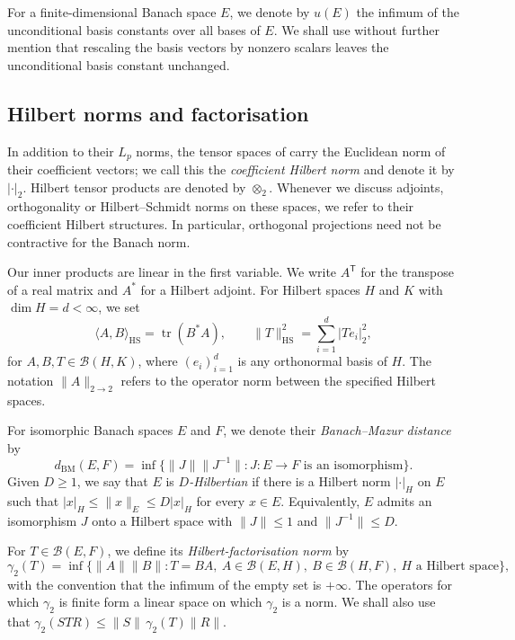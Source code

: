 \documentclass[11pt,a4paper,reqno]{amsart}
\theoremstyle{definition}
\newcommand{\norm}[1]{\lVert #1\rVert}
\DeclareMathOperator{\tr}{tr}
\numberwithin{equation}{section}
\begin{document}
For a finite-dimensional Banach space $E$, we denote by $u(E)$ the infimum of the unconditional basis constants over all bases of $E$. We shall use without further mention that rescaling the basis vectors by nonzero scalars leaves the unconditional basis constant unchanged.

\subsection{Hilbert norms and factorisation}\label{sec:hilbert-norms}
In addition to their $L_p$ norms, the tensor spaces of  carry the Euclidean norm of their coefficient vectors; we call this the \emph{coefficient Hilbert norm} and denote it by $|\cdot|_2$. Hilbert tensor products are denoted by $\otimes_2$. Whenever we discuss adjoints, orthogonality or Hilbert--Schmidt norms on these spaces, we refer to their coefficient Hilbert structures. In particular, orthogonal projections need not be contractive for the Banach norm.

Our inner products are linear in the first variable. We write $A^{\mathsf T}$ for the transpose of a real matrix and $A^*$ for a Hilbert adjoint. For Hilbert spaces $H$ and $K$ with $\dim H=d<\infty$, we set
\begin{equation*}
 \langle A,B\rangle_{\mathrm{HS}}=\tr(B^*A),\qquad
 \norm T_{\mathrm{HS}}^2=\sum_{i=1}^d|Te_i|_2^2,
\end{equation*}
for $A,B,T\in\mathscr B(H,K)$, where $(e_i)_{i=1}^d$ is any orthonormal basis of $H$. The notation $\norm A_{2\to2}$ refers to the operator norm between the specified Hilbert spaces.

For isomorphic Banach spaces $E$ and $F$, we denote their \emph{Banach--Mazur distance} by
\begin{equation*}
 d_{\mathrm{BM}}(E,F)
 =\inf\{\norm J\norm{J^{-1}}:
             J\colon E\to F\text{ is an isomorphism}\}.
\end{equation*}
Given $D\geq1$, we say that $E$ is \emph{$D$-Hilbertian} if there is a Hilbert norm $|\cdot|_H$ on $E$ such that $|x|_H\leq\norm x_E\leq D|x|_H$ for every $x\in E$. Equivalently, $E$ admits an isomorphism $J$ onto a Hilbert space with $\norm J\leq1$ and $\norm{J^{-1}}\leq D$.

For $T\in\mathscr B(E,F)$, we define its \emph{Hilbert-factorisation norm} by
\begin{equation*}
 \gamma_2(T)=\inf\{\norm A\norm B:T=BA,\
                 A\in\mathscr B(E,H),\ B\in\mathscr B(H,F),\
                 H\text{ a Hilbert space}\},
\end{equation*}
with the convention that the infimum of the empty set is $+\infty$. The operators for which $\gamma_2$ is finite form a linear space on which $\gamma_2$ is a norm. We shall also use that $\gamma_2(STR)\leq\norm S\,\gamma_2(T)\norm R$.
\end{document}
